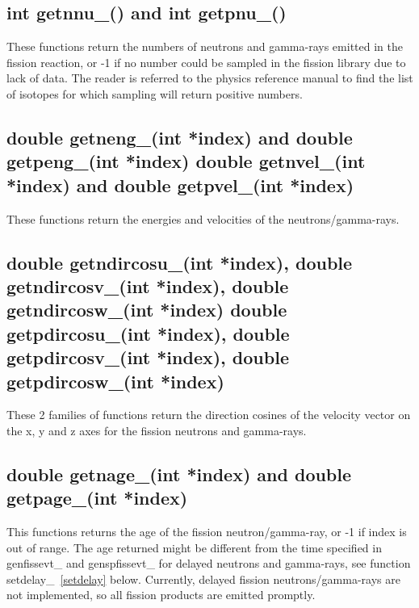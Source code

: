 \documentclass[fleqn,11pt]{article}
\begin{document}
\subsection{int getnnu\_() and int getpnu\_()}

These functions return the numbers of neutrons and gamma-rays 
emitted in the fission reaction, or -1 if no number could be
sampled in the fission library due to lack of data. The reader 
is referred to the physics reference manual to find the list 
of isotopes for which sampling will return positive numbers.

\subsection{double getneng\_(int *index) and 
double getpeng\_(int *index) \newline
double getnvel\_(int *index) and 
double getpvel\_(int *index)}

These functions return the energies and velocities of the 
neutrons/gamma-rays.

\subsection{double getndircosu\_(int *index), double 
getndircosv\_(int *index), \newline double getndircosw\_(int *index) \newline \newline
double getpdircosu\_(int *index), double 
getpdircosv\_(int *index), \newline double getpdircosw\_(int *index)}

These 2 families of functions return the direction cosines 
of the velocity vector on the x, y and z axes for the fission 
neutrons and gamma-rays.

\subsection{double getnage\_(int *index) and double 
getpage\_(int *index)}

This functions returns the age of the fission neutron/gamma-ray, 
or -1 if index is out of range. The age returned might be 
different from the time specified in genfissevt\_ and 
genspfissevt\_ for delayed neutrons and gamma-rays, see function
setdelay\_~\ref{setdelay} below. Currently,
delayed fission neutrons/gamma-rays are not implemented, so
all fission products are emitted promptly.
\end{document}
